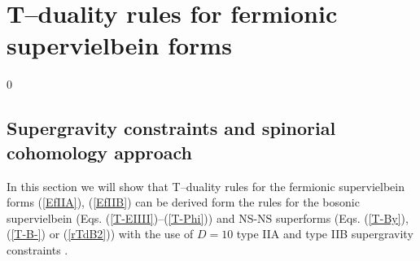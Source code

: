 \documentclass[a4paper,11pt]{article}
\begin{document}
\section{T--duality rules for fermionic supervielbein forms} 
\setcounter{equation}0

\subsection{Supergravity constraints and spinorial cohomology approach}

In this section we will show that  T--duality rules for the 
fermionic supervielbein forms 
(\ref{EfIIA}), (\ref{EfIIB}) can be derived 
form the rules for the bosonic supervielbein 
(Eqs. (\ref{T-EIIII})--(\ref{T-Phi})) and NS-NS superforms  
(Eqs. (\ref{T-By}), (\ref{T-B-}) or (\ref{rTdB2}))
with the use 
of $D=10$ type IIA and type IIB supergravity constraints \cite{c0}. 
\end{document}
